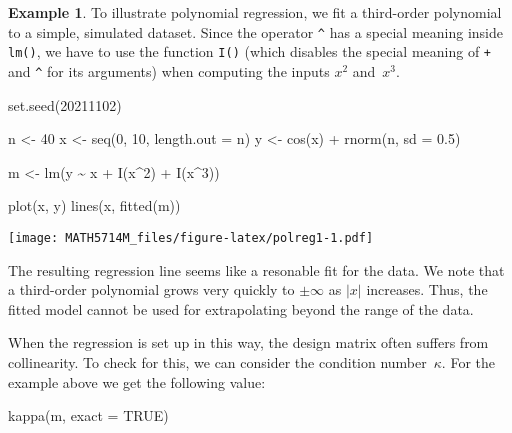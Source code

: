 \documentclass[
  a4paper,
]{article}
\newenvironment{Shaded}{\begin{snugshade}}{\end{snugshade}}
\newcommand{\AttributeTok}[1]{\textcolor[rgb]{0.77,0.63,0.00}{#1}}
\newcommand{\ConstantTok}[1]{\textcolor[rgb]{0.00,0.00,0.00}{#1}}
\newcommand{\DecValTok}[1]{\textcolor[rgb]{0.00,0.00,0.81}{#1}}
\newcommand{\FloatTok}[1]{\textcolor[rgb]{0.00,0.00,0.81}{#1}}
\newcommand{\FunctionTok}[1]{\textcolor[rgb]{0.00,0.00,0.00}{#1}}
\newcommand{\NormalTok}[1]{#1}
\newcommand{\OtherTok}[1]{\textcolor[rgb]{0.56,0.35,0.01}{#1}}
\newcommand{\SpecialCharTok}[1]{\textcolor[rgb]{0.00,0.00,0.00}{#1}}
\theoremstyle{definition}
\theoremstyle{definition}
\newtheorem{example}{Example}[section]
\theoremstyle{definition}
\theoremstyle{definition}
\theoremstyle{remark}
\begin{document}
\begin{example}
To illustrate polynomial regression, we fit a third-order polynomial
to a simple, simulated dataset. Since the operator \texttt{\^{}} has a special
meaning inside \texttt{lm()}, we have to use the function \texttt{I()} (which disables
the special meaning of \texttt{+} and \texttt{\^{}} for its arguments) when computing
the inputs \(x^2\) and~\(x^3\).

\begin{Shaded}
\begin{Highlighting}[]
\FunctionTok{set.seed}\NormalTok{(}\DecValTok{20211102}\NormalTok{)}

\NormalTok{n }\OtherTok{\textless{}{-}} \DecValTok{40}
\NormalTok{x }\OtherTok{\textless{}{-}} \FunctionTok{seq}\NormalTok{(}\DecValTok{0}\NormalTok{, }\DecValTok{10}\NormalTok{, }\AttributeTok{length.out =}\NormalTok{ n)}
\NormalTok{y }\OtherTok{\textless{}{-}} \FunctionTok{cos}\NormalTok{(x) }\SpecialCharTok{+} \FunctionTok{rnorm}\NormalTok{(n, }\AttributeTok{sd =} \FloatTok{0.5}\NormalTok{)}

\NormalTok{m }\OtherTok{\textless{}{-}} \FunctionTok{lm}\NormalTok{(y }\SpecialCharTok{\textasciitilde{}}\NormalTok{ x }\SpecialCharTok{+} \FunctionTok{I}\NormalTok{(x}\SpecialCharTok{\^{}}\DecValTok{2}\NormalTok{) }\SpecialCharTok{+} \FunctionTok{I}\NormalTok{(x}\SpecialCharTok{\^{}}\DecValTok{3}\NormalTok{))}

\FunctionTok{plot}\NormalTok{(x, y)}
\FunctionTok{lines}\NormalTok{(x, }\FunctionTok{fitted}\NormalTok{(m))}
\end{Highlighting}
\end{Shaded}

\texttt{[image: MATH5714M\_files/figure-latex/polreg1-1.pdf]}

The resulting regression line seems like a resonable fit for the data.
We note that a third-order polynomial grows very quickly to \(\pm\infty\)
as \(|x|\) increases. Thus, the fitted model cannot be used for extrapolating
beyond the range of the data.
\end{example}

When the regression is set up in this way, the design matrix often suffers
from collinearity. To check for this, we can consider the condition
number~\(\kappa\). For the example above we get the following value:

\begin{Shaded}
\begin{Highlighting}[]
\FunctionTok{kappa}\NormalTok{(m, }\AttributeTok{exact =} \ConstantTok{TRUE}\NormalTok{)}
\end{Highlighting}
\end{Shaded}
\end{document}
